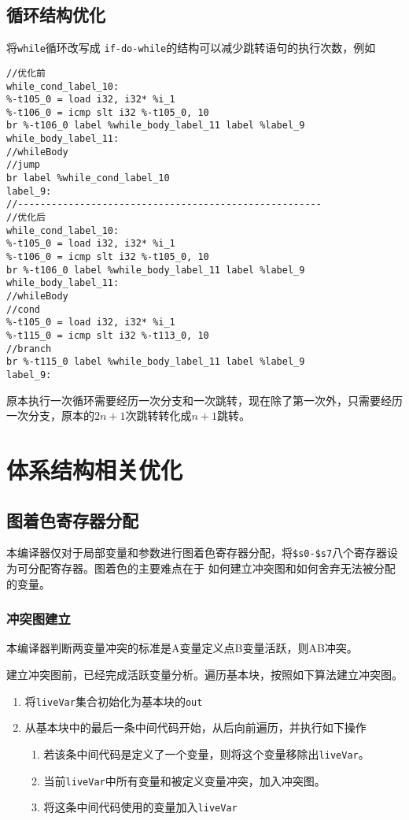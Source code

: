 \subsection{循环结构优化}

将\texttt{while}循环改写成 \texttt{if-do-while}的结构可以减少跳转语句的执行次数，例如

\begin{verbatim}
//优化前
while_cond_label_10:
%-t105_0 = load i32, i32* %i_1
%-t106_0 = icmp slt i32 %-t105_0, 10
br %-t106_0 label %while_body_label_11 label %label_9
while_body_label_11:
//whileBody 
//jump
br label %while_cond_label_10
label_9:
//------------------------------------------------------
//优化后
while_cond_label_10:
%-t105_0 = load i32, i32* %i_1
%-t106_0 = icmp slt i32 %-t105_0, 10
br %-t106_0 label %while_body_label_11 label %label_9
while_body_label_11:
//whileBody
//cond
%-t105_0 = load i32, i32* %i_1
%-t115_0 = icmp slt i32 %-t113_0, 10
//branch
br %-t115_0 label %while_body_label_11 label %label_9
label_9:
 \end{verbatim}
 原本执行一次循环需要经历一次分支和一次跳转，现在除了第一次外，只需要经历一次分支，原本的$2n+1$次跳转转化成$n+1$跳转。
\section{体系结构相关优化}

\subsection{图着色寄存器分配}

本编译器仅对于局部变量和参数进行图着色寄存器分配，将\texttt{\$s0-\$s7}八个寄存器设为可分配寄存器。图着色的主要难点在于
如何建立冲突图和如何舍弃无法被分配的变量。

\subsubsection{冲突图建立}

本编译器判断两变量冲突的标准是A变量定义点B变量活跃，则AB冲突。

建立冲突图前，已经完成活跃变量分析。遍历基本块，按照如下算法建立冲突图。
\begin{enumerate}
    \item 将\texttt{liveVar}集合初始化为基本块的\texttt{out}
    \item 从基本块中的最后一条中间代码开始，从后向前遍历，并执行如下操作
            \begin{enumerate}
                \item 若该条中间代码是定义了一个变量，则将这个变量移除出\texttt{liveVar}。
                \item 当前\texttt{liveVar}中所有变量和被定义变量冲突，加入冲突图。
                \item 将这条中间代码使用的变量加入\texttt{liveVar}
            \end{enumerate}
\end{enumerate}

